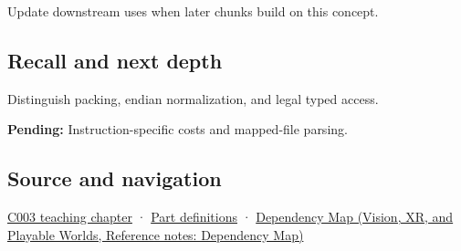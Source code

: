 Update downstream uses when later chunks build on this concept.

\subsection{Recall and next depth}\label{appendix-0682dbfc5f0e-recall-and-next-depth}

Distinguish packing, endian normalization, and legal typed access.

\textbf{Pending:} Instruction-specific costs and mapped-file parsing.

\subsection{Source and navigation}\label{appendix-0682dbfc5f0e-source-and-navigation}

\hyperref[01-foundations-i-ch002-where-the-bytes-live]{C003 teaching chapter} · \hyperref[appendix-fd090d982a15-m003---parts-41-60]{Part definitions} · \href{../07-Vision-XR-and-Playable-Worlds/main.pdf\#nameddest=appendix-4ad47bdd269a}{Dependency Map (Vision, XR, and Playable Worlds, Reference notes: Dependency Map)}
